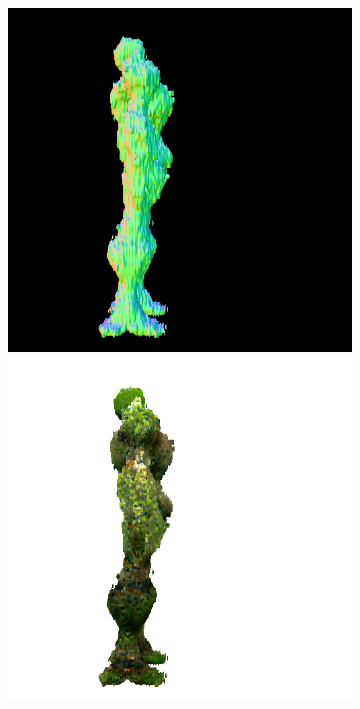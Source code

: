\begin{figure}[ht]
    \centering
    \begin{subfigure}[b]{0.222\textwidth}
        \centering
        \fontsize{9pt}{7pt}\selectfont{}\vspace{.1cm}
        \includegraphics[width=\textwidth]{figures/appendix/magic123_refine_robot_right_0_part2.png}
        \includegraphics[width=\textwidth]{figures/appendix/magic123_refine_robot_right_0_part1.png}

\end{subfigure}
\end{figure}
